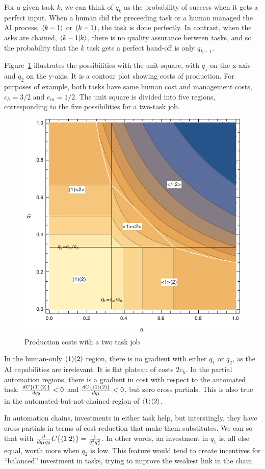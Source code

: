 \documentclass{article}
\begin{document}
For a given task $k$, we can think of $q_k$ as the probability of success when it gets a perfect input.
When a human did the preceeding task or a human managed the AI process, $\langle k-1 \rangle$ or $( k-1 )$, the task is done perfectly.
In contrast, when the asks are chained, $\langle k-1|k \rangle$, there is no quality assurance between tasks, and so the probability that the $k$ task gets a perfect hand-off is only $q_{k-1}$.

Figure~\ref{fig:diagram} illustrates the possibilities with the unit square, with $q_1$ on the x-axis and $q_2$ on the y-axis.
It is a contour plot showing costs of production.
For purposes of example, both tasks have same human cost and management costs, $c_h = 3/2$ and $c_m = 1/2$. 
The unit square is divided into five regions, corresponding to the five possibilities for a two-task job.

\begin{figure}
  \caption{Production costs with a two task job} \label{fig:diagram}
  \centering
    \includegraphics[width = 0.7 \linewidth]{images/diagram.pdf}
\end{figure}

In the human-only $( 1 )( 2 )$ region, there is no gradient with either $q_1$ or $q_2$, as the AI capabilities are irrelevant.
It is flat plateau of costs $2c_h$.
In the partial automation regions, there is a gradient in cost with respect to the automated task: $\frac{d C\{ ( 1 )\langle 2 \rangle \}}{dq_2} < 0$ and $\frac{d C\{ \langle 1 \rangle( 2 ) \}}{dq_1} < 0$, but zero cross partials.
This is also true in the automated-but-not-chained region of $\langle 1 \rangle\langle 2 \rangle$.

In automation chains, investments in either task help, but interstingly, they have cross-partials in terms of cost reduction that make them substitutes.
We can so that with $\frac{d}{d q_1 q_2} C\{ \langle 1|2 \rangle \} = \frac{1}{q_1^2q_2^2}$.
In other words, an investment in $q_1$ is, all else equal, worth more when $q_2$ is low.
This feature would tend to create incentives for ``balanced'' investment in tasks, trying to improve the weakest link in the chain.
\end{document}
